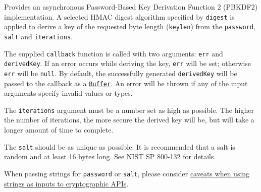 Provides an asynchronous Password-Based Key Derivation Function 2
(PBKDF2) implementation. A selected HMAC digest algorithm specified by
\texttt{digest} is applied to derive a key of the requested byte length
(\texttt{keylen}) from the \texttt{password}, \texttt{salt} and
\texttt{iterations}.

The supplied \texttt{callback} function is called with two arguments:
\texttt{err} and \texttt{derivedKey}. If an error occurs while deriving
the key, \texttt{err} will be set; otherwise \texttt{err} will be
\texttt{null}. By default, the successfully generated
\texttt{derivedKey} will be passed to the callback as a
\href{buffer.md}{\texttt{Buffer}}. An error will be thrown if any of the
input arguments specify invalid values or types.

The \texttt{iterations} argument must be a number set as high as
possible. The higher the number of iterations, the more secure the
derived key will be, but will take a longer amount of time to complete.

The \texttt{salt} should be as unique as possible. It is recommended
that a salt is random and at least 16 bytes long. See
\href{https://nvlpubs.nist.gov/nistpubs/Legacy/SP/nistspecialpublication800-132.pdf}{NIST
SP 800-132} for details.

When passing strings for \texttt{password} or \texttt{salt}, please
consider
\hyperref[using-strings-as-inputs-to-cryptographic-apis]{caveats when
using strings as inputs to cryptographic APIs}.

\begin{Shaded}
\begin{Highlighting}[]
\NormalTok{ \{}
\OperatorTok{,}
\NormalTok{\} }\OperatorTok{=}  \NormalTok{(}\NormalTok{)}\OperatorTok{;}

\NormalTok{(}\OperatorTok{,} \OperatorTok{,} \OperatorTok{,} \OperatorTok{,} \OperatorTok{,}\OperatorTok{,}\KeywordTok{=\textgreater{}}\NormalTok{ \{}
  \OperatorTok{;}
  \NormalTok{(}\NormalTok{))}\OperatorTok{;}  
\NormalTok{\})}\OperatorTok{;}
\end{Highlighting}
\end{Shaded}

